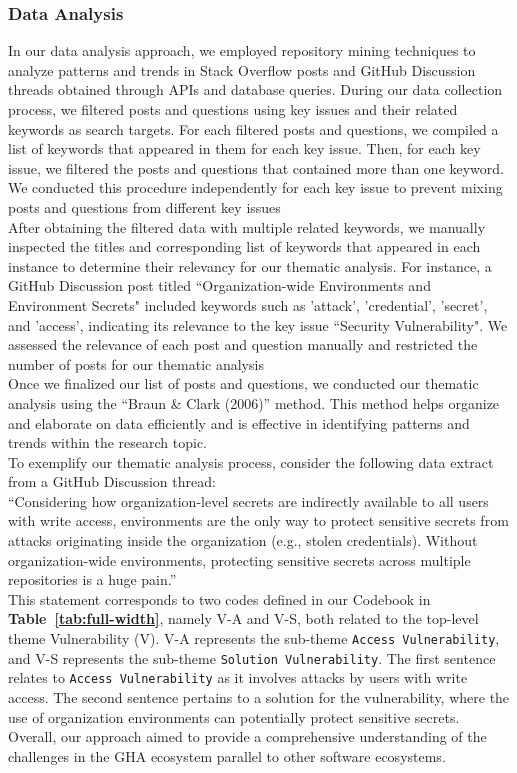 \documentclass[conference]{IEEEtran}
\begin{document}
            \subsubsection{\textbf{Data Analysis}}
                In our data analysis approach, we employed repository mining techniques to analyze patterns and trends in Stack Overflow posts and GitHub Discussion threads obtained through APIs and database queries. During our data collection process, we filtered posts and questions using key issues and their related keywords as search targets. For each filtered posts and questions, we compiled a list of keywords that appeared in them for each key issue. Then, for each key issue, we filtered the posts and questions that contained more than one keyword. We conducted this procedure independently for each key issue to prevent mixing posts and questions from different key issues \\
                After obtaining the filtered data with multiple related keywords, we manually inspected the titles and corresponding list of keywords that appeared in each instance to determine their relevancy for our thematic analysis. For instance, a GitHub Discussion post titled “Organization-wide Environments and Environment Secrets" included keywords such as 'attack', 'credential', 'secret', and 'access', indicating its relevance to the key issue “Security Vulnerability". We assessed the relevance of each post and question manually and restricted the number of posts for our thematic analysis\\
                Once we finalized our list of posts and questions, we conducted our thematic analysis using the “Braun \& Clark (2006)” method. This method helps organize and elaborate on data efficiently and is effective in identifying patterns and trends within the research topic.\\
                To exemplify our thematic analysis process, consider the following data extract from a GitHub Discussion thread:\\
                “Considering how organization-level secrets are indirectly available to all users with write access, environments are the only way to protect sensitive secrets from attacks originating inside the organization (e.g., stolen credentials). Without organization-wide environments, protecting sensitive secrets across multiple repositories is a huge pain.”\\
                This statement corresponds to two codes defined in our Codebook in \textbf{Table~\ref{tab:full-width}}, namely V-A and V-S, both related to the top-level theme Vulnerability (V). V-A represents the sub-theme \texttt{Access Vulnerability}, and V-S represents the sub-theme \texttt{Solution Vulnerability}. The first sentence relates to \texttt{Access Vulnerability} as it involves attacks by users with write access. The second sentence pertains to a solution for the vulnerability, where the use of organization environments can potentially protect sensitive secrets. Overall, our approach aimed to provide a comprehensive understanding of the challenges in the GHA ecosystem parallel to other software ecosystems.\\
\end{document}
